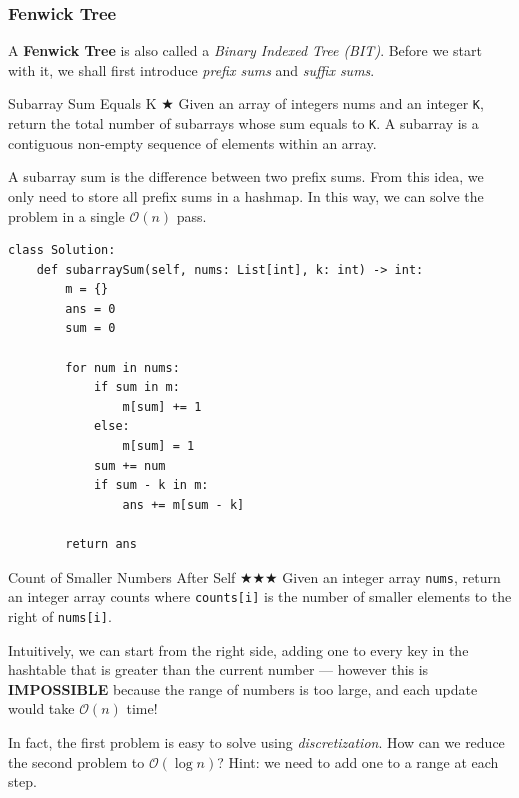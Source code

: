 \documentclass{article}
\begin{document}
\vspace{4ex}

\subsubsection{Fenwick Tree}

A \textbf{Fenwick Tree} is also called a \emph{Binary Indexed Tree (BIT)}. Before we start with it, we shall first introduce \emph{prefix sums} and \emph{suffix sums}.

\begin{Question}{Subarray Sum Equals K $\bigstar$}
Given an array of integers nums and an integer \texttt{K}, return the total number of subarrays whose sum equals to \texttt{K}. A subarray is a contiguous non-empty sequence of elements within an array.
\end{Question}

A subarray sum is the difference between two prefix sums. From this idea, we only need to store all prefix sums in a hashmap. In this way, we can solve the problem in a single $\mathcal O(n)$ pass.

\begin{lstlisting}[style=python]
class Solution:
    def subarraySum(self, nums: List[int], k: int) -> int:
        m = {}
        ans = 0
        sum = 0
        
        for num in nums:
            if sum in m:
                m[sum] += 1
            else:
                m[sum] = 1
            sum += num
            if sum - k in m:
                ans += m[sum - k]
                
        return ans
\end{lstlisting}

\begin{Question}{Count of Smaller Numbers After Self $\bigstar\bigstar\bigstar$}
Given an integer array \texttt{nums}, return an integer array counts where \texttt{counts[i]} is the number of smaller elements to the right of \texttt{nums[i]}.
\end{Question}

Intuitively, we can start from the right side, adding one to every key in the hashtable that is greater than the current number --- however this is \textbf{IMPOSSIBLE} because the range of numbers is too large, and each update would take $\mathcal{O}(n)$ time!

In fact, the first problem is easy to solve using \emph{discretization}. How can we reduce the second problem to $\mathcal{O}(\log n)$? Hint: we need to add one to a range at each step.
\end{document}
